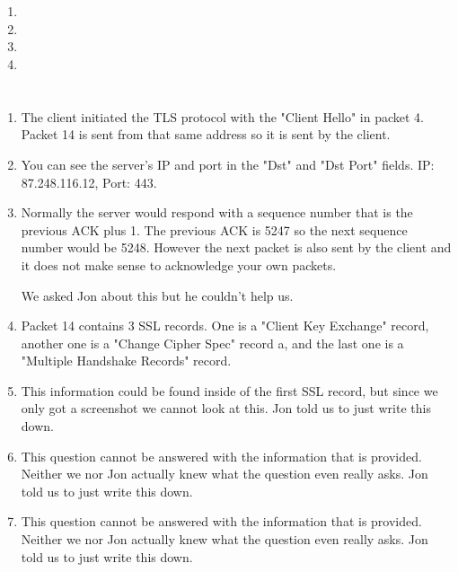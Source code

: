 \documentclass[12pt, a4paper]{article}
\begin{document}
\section{} %
\begin{enumerate}[a]
	\item %
	\item %
	\item %
	\item %
\end{enumerate}

\section{} %
\begin{enumerate}[a]
	\item %
	The client initiated the TLS protocol with the "Client Hello" in packet 4. Packet 14 is sent from that same address so it is sent by the client.
	\item %
	You can see the server's IP and port in the "Dst" and "Dst Port" fields. IP: 87.248.116.12, Port: 443.
	\item %
	Normally the server would respond with a sequence number that is the previous ACK plus 1. The previous ACK is 5247 so the next sequence number would be 5248. However the next packet is also sent by the client and it does not make sense to acknowledge your own packets.

	We asked Jon about this but he couldn't help us.
	\item %
	Packet 14 contains 3 SSL records. One is a "Client Key Exchange" record, another one is a "Change Cipher Spec" record a, and the last one is a "Multiple Handshake Records" record.
	\item %
	This information could be found inside of the first SSL record, but since we only got a screenshot we cannot look at this. Jon told us to just write this down.
	\item %
	This question cannot be answered with the information that is provided. Neither we nor Jon actually knew what the question even really asks. Jon told us to just write this down.
	\item %
	This question cannot be answered with the information that is provided. Neither we nor Jon actually knew what the question even really asks. Jon told us to just write this down.
\end{enumerate}
\end{document}

